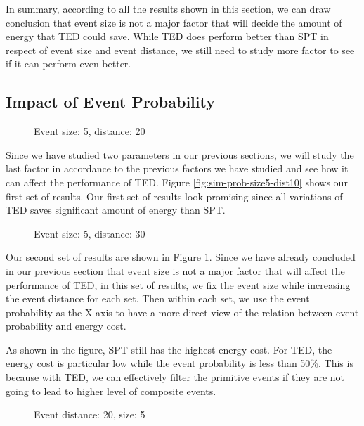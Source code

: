 In summary, according to all the results shown in this section, we can draw conclusion that event size is not a major factor that will decide the amount of energy that TED could save. While TED does perform better than SPT in respect of event size and event distance, we still need to study more factor to see if it can perform even better.

\subsection{Impact of Event Probability}

\begin{figure}
\centering
{}
\caption{Event size: 5, distance: 20}
\label{fig:sim-prob-size5-dist20}
\end{figure}

Since we have studied two parameters in our previous sections, we will study the last factor in accordance to the previous factors we have studied and see how it can affect the performance of TED. Figure \ref{fig:sim-prob-size5-dist10} shows our first set of results. Our first set of results look promising since all variations of TED saves significant amount of energy than SPT.

\begin{figure}
\centering
{}
\caption{Event size: 5, distance: 30}
\label{fig:sim-prob-size5-dist30}
\end{figure}

Our second set of results are shown in Figure \ref{fig:sim-prob-size5-dist20}. Since we have already concluded in our previous section that event size is not a major factor that will affect the performance of TED, in this set of results, we fix the event size while increasing the event distance for each set. Then within each set, we use the event probability as the X-axis to have a more direct view of the relation between event probability and energy cost.

As shown in the figure, SPT still has the highest energy cost. For TED, the energy cost is particular low while the event probability is less than 50\%. This is because with TED, we can effectively filter the primitive events if they are not going to lead to higher level of composite events.

\begin{figure}
\centering
{}
\caption{Event distance: 20, size: 5}
\label{fig:sim-prob-dist20-size5}
\end{figure}

